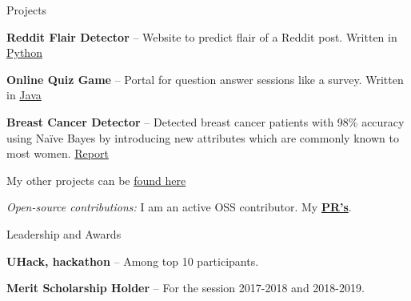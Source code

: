 \documentclass{resume} %
\begin{document}
\begin{rSection}{Projects}
  \begin{rProjectSection}
    \item \textbf {Reddit Flair Detector} -- Website to predict flair of a Reddit post. Written in \href{https://github.com/siddhi523/reddit_flair_detector_}{Python}
    \item \textbf {Online Quiz Game} --  Portal for question answer sessions like a survey. Written in \href{https://github.com/siddhi523/Online_Quiz_Game}{Java}
    \item \textbf {Breast Cancer Detector} -- Detected breast cancer patients with 98\% accuracy using Naïve Bayes by introducing new attributes which are commonly known to most women. \href{https://www.semanticscholar.org/paper/Empirical-Analysis-of-Cervical-and-Breast-Cancer-Kaur-Pruthi/28fd7fd826460167a685b29cf3f56cfe83da1cb6}{Report}
    \item My other projects can be \href{https://github.com/siddhi523?tab=repositories}{found here}
  \end{rProjectSection}

  \begin{rBlurbSection}
    \item {\em Open-source contributions:}
      I am an active OSS contributor. My \href{https://github.com/pulls}{\textbf{PR's}}.
  \end{rBlurbSection}
\end{rSection}


\begin{rSection}{Leadership and Awards}
  \begin{rProjectSection}
    \item \textbf {UHack, hackathon} -- Among top 10 participants.
  \end{rProjectSection}
  \begin{rProjectSection}
    \item \textbf {Merit Scholarship Holder} -- For the session 2017-2018 and 2018-2019.
  \end{rProjectSection}

\end{rSection}

\end{document}
